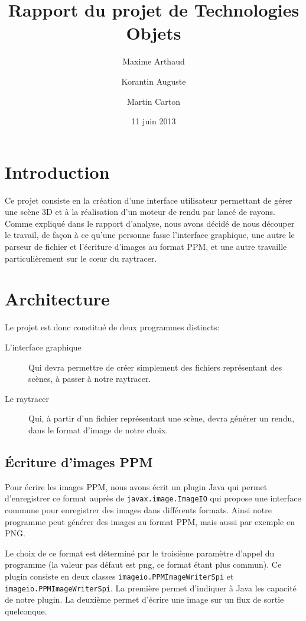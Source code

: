 \documentclass[a4paper]{article}
\title{Rapport du projet de Technologies Objets}
\author{Maxime Arthaud \and Korantin Auguste \and Martin Carton}
\date{11 juin 2013}
\begin{document}
\maketitle 
\tableofcontents
\listoffigures
\newpage
\section{Introduction}
  Ce projet consiste en la création d'une interface utilisateur permettant de
  gérer une scène 3D et à la réalisation d'un moteur de rendu par lancé de
  rayons.
  Comme expliqué dans le rapport d'analyse, nous avons décidé de nous découper
  le travail, de façon à ce qu'une personne fasse l'interface graphique,
  une autre le parseur de fichier et l'écriture d'images au format PPM, et une
  autre travaille particulièrement sur le cœur du raytracer.
\section{Architecture}
  Le projet est donc constitué de deux programmes distincts:
  \begin{description}
      \item[L'interface graphique] Qui devra permettre de créer simplement des
        fichiers représentant des scènes, à passer à notre raytracer.
      \item[Le raytracer] Qui, à partir d'un fichier représentant une scène,
        devra générer un rendu, dans le format d'image de notre choix.
  \end{description}
  \subsection{Écriture d'images PPM}
    Pour écrire les images PPM, nous avons écrit un plugin Java qui permet
    d'enregistrer ce format auprès de \verb+javax.image.ImageIO+ qui propose une
    interface commune pour enregistrer des images dans différents formats. Ainsi
    notre programme peut générer des images au format PPM, mais aussi par
    exemple en PNG.
    
    Le choix de ce format est déterminé par le troisième paramètre d'appel du
    programme (la valeur pas défaut est png, ce format étant plus commun).
    Ce plugin consiste en deux classes \verb+imageio.PPMImageWriterSpi+ et
    \verb+imageio.PPMImageWriterSpi+. La première permet d'indiquer à Java les
    capacité de notre plugin. La deuxième permet d'écrire une image sur un flux
    de sortie quelconque.
\end{document}
